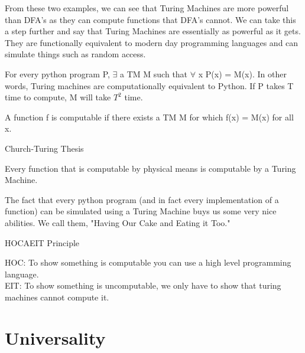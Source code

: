 From these two examples, we can see that Turing Machines are more powerful than DFA's as they can compute functions that DFA's cannot. We can take this a step further and say that Turing Machines are essentially as powerful as it gets. They are functionally equivalent to modern day programming languages and can simulate things such as random access.

\begin{theorem}
    
    For every python program P, $\exists$ a TM M such that $\forall$ x P(x) = M(x). In other words, Turing machines are computationally equivalent to Python. If P takes T time to compute, M will take $T^2$ time. 
\end{theorem}

\begin{theorem}

    A function f is computable if there exists a TM M for which f(x) = M(x) for all x. 
\end{theorem}

\vspace{1cm}

\begin{mdframed}[backgroundcolor=framebackground]
    Church-Turing Thesis
    
    \vspace{.25cm}

    Every function that is computable by physical means is computable by a Turing Machine.
\end{mdframed}

\pagebreak

The fact that every python program (and in fact every implementation of a function) can be simulated using a Turing Machine buys us some very nice abilities. We call them, "Having Our Cake and Eating it Too."

\begin{definition}
    HOCAEIT Principle

    HOC: To show something is computable you can use a high level programming language. \\
    EIT: To show something is uncomputable, we only have to show that turing machines cannot compute it.
\end{definition}

\section{Universality}

